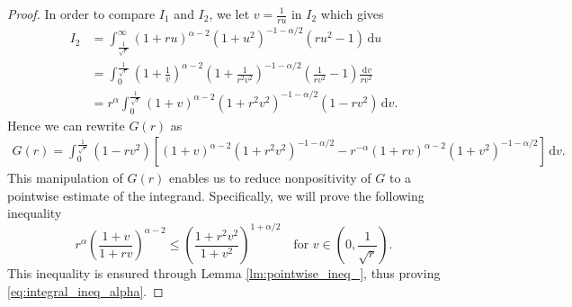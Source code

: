 \documentclass[10pt,leqno]{amsart}
\newcommand{\dd}{\, \mathrm{d}}
\numberwithin{Theorem}{section}
\theoremstyle{definition}
\theoremstyle{remark}
\numberwithin{equation}{section}
\numberwithin{equation}{section}
\begin{document}
\begin{proof}
In order to compare $I_1$ and $I_2$, we let $v=\frac{1}{ru}$ in $I_2$ which gives
\begin{align*}
    I_2&=\int_{\frac{1}{\sqrt{r}}}^{\infty} (1+ru)^{\alpha-2} (1+u^2)^{-1-\alpha/2} (ru^2-1) \dd u \\
    &= \int_0^{\frac{1}{\sqrt{r}}} \left(1+\frac{1}{v}\right)^{\alpha-2} \left(1+\frac{1}{r^2v^2}\right)^{-1-\alpha/2} \left(\frac{1}{r v^2}-1\right) \frac{\dd v}{rv^2} \\
    &= r^{\alpha} \int_0^{\frac{1}{\sqrt{r}}}  (1+v)^{\alpha-2} (1+r^2v^2)^{-1-\alpha/2} (1-r v^2) \dd v. 
\end{align*}
Hence we can rewrite $G(r)$ as
\begin{align}
    G(r) = \int_0^{\frac{1}{\sqrt{r}}} (1-r v^2)\left[ (1+v)^{\alpha-2} (1+r^2v^2)^{-1-\alpha/2}  -r^{-\alpha} (1+rv)^{\alpha-2} (1+v^2)^{-1-\alpha/2}\right] \dd v.
\end{align}
This manipulation of $G(r)$ enables us to reduce nonpositivity of $G$ to a pointwise estimate of the integrand. Specifically, we will prove the following inequality
  \begin{equation} \label{pointwise_ineq_}
    r^{\alpha} \left( \frac{1+v}{1+rv} \right)^{\alpha-2} \leq \left( \frac{1+r^2v^2}{1+v^2} \right)^{1+\alpha/2} \quad \text{for } v \in \left(0, \frac{1}{\sqrt{r}}\right).
    \end{equation}
    This inequality is ensured through Lemma \ref{lm:pointwise_ineq_}, thus proving \eqref{eq:integral_ineq_alpha}.
\end{proof}
\end{document}
